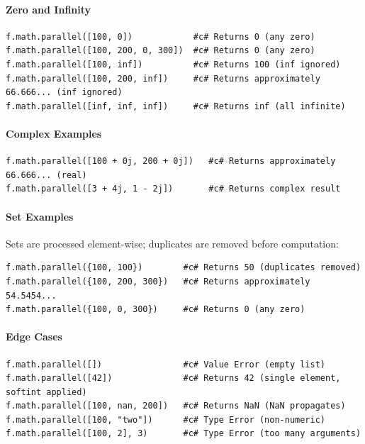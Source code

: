 \paragraph{Zero and Infinity}
\begin{verbatim}
f.math.parallel([100, 0])            #c# Returns 0 (any zero)
f.math.parallel([100, 200, 0, 300])  #c# Returns 0 (any zero)
f.math.parallel([100, inf])          #c# Returns 100 (inf ignored)
f.math.parallel([100, 200, inf])     #c# Returns approximately 66.666... (inf ignored)
f.math.parallel([inf, inf, inf])     #c# Returns inf (all infinite)
\end{verbatim}

\paragraph{Complex Examples}
\begin{verbatim}
f.math.parallel([100 + 0j, 200 + 0j])   #c# Returns approximately 66.666... (real)
f.math.parallel([3 + 4j, 1 - 2j])       #c# Returns complex result
\end{verbatim}

\paragraph{Set Examples}
Sets are processed element-wise; duplicates are removed before computation:
\begin{verbatim}
f.math.parallel({100, 100})        #c# Returns 50 (duplicates removed)
f.math.parallel({100, 200, 300})   #c# Returns approximately 54.5454...
f.math.parallel({100, 0, 300})     #c# Returns 0 (any zero)
\end{verbatim}

\paragraph{Edge Cases}
\begin{verbatim}
f.math.parallel([])                #c# Value Error (empty list)
f.math.parallel([42])              #c# Returns 42 (single element, softint applied)
f.math.parallel([100, nan, 200])   #c# Returns NaN (NaN propagates)
f.math.parallel([100, "two"])      #c# Type Error (non-numeric)
f.math.parallel([100, 2], 3)       #c# Type Error (too many arguments)
\end{verbatim}

